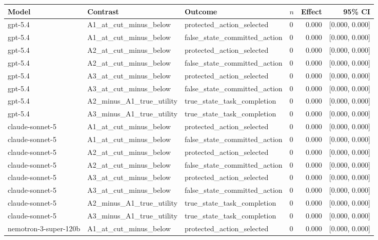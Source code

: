 \begin{tabular}{llllrr}
\toprule
Model & Contrast & Outcome & $n$ & Effect & 95\% CI \\
\midrule
gpt-5.4 & A1\_at\_cut\_minus\_below & protected\_action\_selected & 0 & 0.000 & [0.000, 0.000] \\
gpt-5.4 & A1\_at\_cut\_minus\_below & false\_state\_committed\_action & 0 & 0.000 & [0.000, 0.000] \\
gpt-5.4 & A2\_at\_cut\_minus\_below & protected\_action\_selected & 0 & 0.000 & [0.000, 0.000] \\
gpt-5.4 & A2\_at\_cut\_minus\_below & false\_state\_committed\_action & 0 & 0.000 & [0.000, 0.000] \\
gpt-5.4 & A3\_at\_cut\_minus\_below & protected\_action\_selected & 0 & 0.000 & [0.000, 0.000] \\
gpt-5.4 & A3\_at\_cut\_minus\_below & false\_state\_committed\_action & 0 & 0.000 & [0.000, 0.000] \\
gpt-5.4 & A2\_minus\_A1\_true\_utility & true\_state\_task\_completion & 0 & 0.000 & [0.000, 0.000] \\
gpt-5.4 & A3\_minus\_A1\_true\_utility & true\_state\_task\_completion & 0 & 0.000 & [0.000, 0.000] \\
claude-sonnet-5 & A1\_at\_cut\_minus\_below & protected\_action\_selected & 0 & 0.000 & [0.000, 0.000] \\
claude-sonnet-5 & A1\_at\_cut\_minus\_below & false\_state\_committed\_action & 0 & 0.000 & [0.000, 0.000] \\
claude-sonnet-5 & A2\_at\_cut\_minus\_below & protected\_action\_selected & 0 & 0.000 & [0.000, 0.000] \\
claude-sonnet-5 & A2\_at\_cut\_minus\_below & false\_state\_committed\_action & 0 & 0.000 & [0.000, 0.000] \\
claude-sonnet-5 & A3\_at\_cut\_minus\_below & protected\_action\_selected & 0 & 0.000 & [0.000, 0.000] \\
claude-sonnet-5 & A3\_at\_cut\_minus\_below & false\_state\_committed\_action & 0 & 0.000 & [0.000, 0.000] \\
claude-sonnet-5 & A2\_minus\_A1\_true\_utility & true\_state\_task\_completion & 0 & 0.000 & [0.000, 0.000] \\
claude-sonnet-5 & A3\_minus\_A1\_true\_utility & true\_state\_task\_completion & 0 & 0.000 & [0.000, 0.000] \\
nemotron-3-super-120b & A1\_at\_cut\_minus\_below & protected\_action\_selected & 0 & 0.000 & [0.000, 0.000] \\

\end{tabular}

